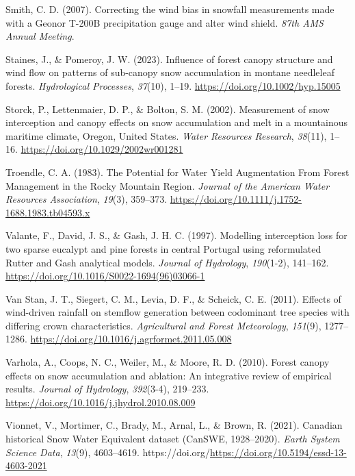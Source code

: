 \documentclass[
  letterpaper,
  DIV=11,
  numbers=noendperiod]{scrartcl}
\newlength{\cslhangindent}
\newenvironment{CSLReferences}[2] %
 {\begin{list}{}{%
  \setlength{\itemindent}{0pt}
  \setlength{\leftmargin}{0pt}
  \setlength{\parsep}{0pt}
  \ifodd #1
   \setlength{\leftmargin}{\cslhangindent}
   \setlength{\itemindent}{-1\cslhangindent}
  \fi
  \setlength{\itemsep}{#2\baselineskip}}}
 {\end{list}}
\begin{document}
\begin{CSLReferences}{1}{0}
Smith, C. D. (2007). {Correcting the wind bias in snowfall measurements
made with a Geonor T-200B precipitation gauge and alter wind shield}.
\emph{87th AMS Annual Meeting}.

Staines, J., \& Pomeroy, J. W. (2023). {Influence of forest canopy
structure and wind flow on patterns of sub-canopy snow accumulation in
montane needleleaf forests}. \emph{Hydrological Processes},
\emph{37}(10), 1--19. \url{https://doi.org/10.1002/hyp.15005}

Storck, P., Lettenmaier, D. P., \& Bolton, S. M. (2002). {Measurement of
snow interception and canopy effects on snow accumulation and melt in a
mountainous maritime climate, Oregon, United States}. \emph{Water
Resources Research}, \emph{38}(11), 1--16.
\url{https://doi.org/10.1029/2002wr001281}

Troendle, C. A. (1983). {The Potential for Water Yield Augmentation From
Forest Management in the Rocky Mountain Region}. \emph{Journal of the
American Water Resources Association}, \emph{19}(3), 359--373.
\url{https://doi.org/10.1111/j.1752-1688.1983.tb04593.x}

Valante, F., David, J. S., \& Gash, J. H. C. (1997). {Modelling
interception loss for two sparse eucalypt and pine forests in central
Portugal using reformulated Rutter and Gash analytical models}.
\emph{Journal of Hydrology}, \emph{190}(1-2), 141--162.
\url{https://doi.org/10.1016/S0022-1694(96)03066-1}

Van Stan, J. T., Siegert, C. M., Levia, D. F., \& Scheick, C. E. (2011).
{Effects of wind-driven rainfall on stemflow generation between
codominant tree species with differing crown characteristics}.
\emph{Agricultural and Forest Meteorology}, \emph{151}(9), 1277--1286.
\url{https://doi.org/10.1016/j.agrformet.2011.05.008}

Varhola, A., Coops, N. C., Weiler, M., \& Moore, R. D. (2010). {Forest
canopy effects on snow accumulation and ablation: An integrative review
of empirical results}. \emph{Journal of Hydrology}, \emph{392}(3-4),
219--233. \url{https://doi.org/10.1016/j.jhydrol.2010.08.009}

Vionnet, V., Mortimer, C., Brady, M., Arnal, L., \& Brown, R. (2021).
{Canadian historical Snow Water Equivalent dataset (CanSWE,
1928--2020)}. \emph{Earth System Science Data}, \emph{13}(9),
4603--4619.
https://doi.org/\url{https://doi.org/10.5194/essd-13-4603-2021}


\end{CSLReferences}
\end{document}
